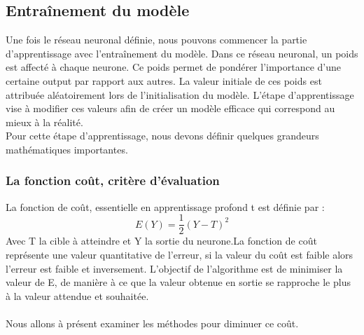 \documentclass[oneside,a4paper,13pt]{article}
\begin{document}
\subsection{Entraînement du modèle}
Une fois le réseau neuronal définie, nous pouvons commencer la partie d'apprentissage avec l'entraînement du modèle. Dans ce réseau neuronal, un poids est affecté à chaque neurone. Ce poids permet de pondérer l'importance d'une certaine output par rapport aux autres. La valeur initiale de ces poids est attribuée aléatoirement lors de l'initialisation du modèle. L'étape d'apprentissage vise à modifier ces valeurs afin de créer un modèle efficace qui correspond au mieux à la réalité.\\
Pour cette étape d'apprentissage, nous devons définir quelques grandeurs mathématiques importantes. 
\subsubsection{La fonction coût, critère d'évaluation}
La fonction de coût, essentielle en apprentissage profond t est définie par : 
\begin{equation}
    E(Y) = \frac{1}{2}(Y - T)^{2}
\end{equation}
Avec T la cible à atteindre et Y la sortie du neurone.La fonction de coût représente une valeur quantitative de l'erreur, si la valeur du coût est faible alors l'erreur est faible et inversement. L'objectif de l'algorithme est de minimiser la valeur de E, de manière à ce que la valeur obtenue en sortie se rapproche le plus à la valeur attendue et souhaitée.\\ \\
Nous allons à présent examiner les méthodes pour diminuer ce coût.
\end{document}
